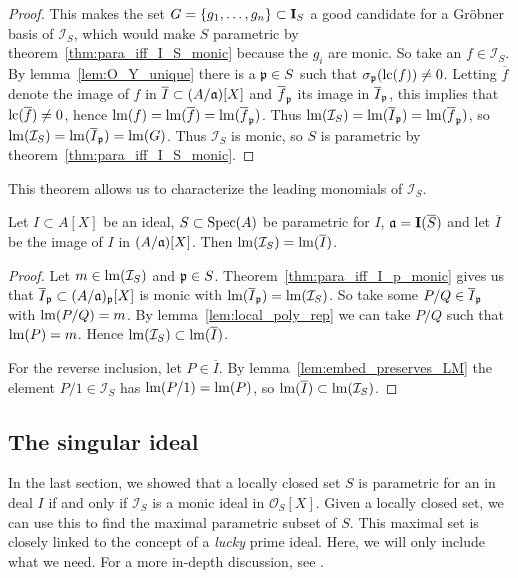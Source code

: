 \begin{proof}
  This makes the set $G = \{g_{1}, \dots, g_{n}\} \subset \operatorname{\mathbf I}_{S}$ a good candidate for a Gröbner basis of $\mathcal I_{S}$, which would make $S$ parametric by theorem~\ref{thm:para_iff_I_S_monic} because the $g_{i}$ are monic. So take an $f \in \mathcal I_{S}$. By lemma~\ref{lem:O_Y_unique} there is a $\mathfrak p \in S$ such that $\sigma_{\mathfrak p}(\operatorname{lc}(f)) \neq 0$. Letting $\overline f$ denote the image of $f$ in $\overline I \subset (A/\mathfrak{a})[X]$ and $\overline f_{\mathfrak p}$ its image in $\overline I_{\mathfrak p}$, this implies that $\operatorname{lc}(\overline f) \neq 0$, hence $\operatorname{lm}(f) = \operatorname{lm}(\overline f) = \operatorname{lm}(\overline f_{\mathfrak p})$. Thus $\operatorname{lm}(\mathcal I_{S}) = \operatorname{lm}(\overline I_{\mathfrak p}) = \operatorname{lm}(\overline f_{\mathfrak p})$, so $\operatorname{lm}(\mathcal I_{S}) = \operatorname{lm}(\overline I_{\mathfrak p}) = \operatorname{lm}(G)$. Thus $\mathcal I_{S}$ is monic, so $S$ is parametric by theorem~\ref{thm:para_iff_I_S_monic}.
\end{proof}

This theorem allows us to characterize the leading monomials of $\mathcal I_{S}$.

\begin{corollary}\label{cor:LM_I_S_eq_LM_overline_I}
  Let $I \subset A[X]$ be an ideal, $S \subset \operatorname{Spec}(A)$ be parametric for $I$, $\mathfrak{a} = \operatorname{\mathbf I}(\overline S)$ and let $\overline I$ be the image of $I$ in $(A/\mathfrak{a})[X]$. Then $\operatorname{lm}(\mathcal I_{S}) = \operatorname{lm}(\overline I)$.
\end{corollary}
\begin{proof}
  Let $m \in \operatorname{lm}(\mathcal I_{S})$ and $\mathfrak p \in S$. Theorem~\ref{thm:para_iff_I_p_monic} gives us that $\overline I_{\mathfrak p} \subset (A/\mathfrak{a})_{\mathfrak p}[X]$ is monic with $\operatorname{lm}(\overline I_{\mathfrak p}) = \operatorname{lm}(\mathcal I_{S})$. So take some $P/Q \in \overline I_{\mathfrak p}$ with $\operatorname{lm}(P/Q) = m$. By lemma~\ref{lem:local_poly_rep} we can take $P/Q$ such that $\operatorname{lm}(P) = m$. Hence $\operatorname{lm}(\mathcal I_{S}) \subset \operatorname{lm}(\overline I)$.

  For the reverse inclusion, let $P \in \overline I$. By lemma~\ref{lem:embed_preserves_LM} the element $P/1 \in \mathcal I_{S}$ has $\operatorname{lm}(P/1) = \operatorname{lm}(P)$, so $\operatorname{lm}(\overline I) \subset \operatorname{lm}(\mathcal I_{S})$.
\end{proof}















\subsection{The singular ideal}
In the last section, we showed that a locally closed set $S$ is parametric for an in deal $I$ if and only if $\mathcal I_{S}$ is a monic ideal in $\mathcal O_{S}[X]$. Given a locally closed set, we can use this to find the maximal parametric subset of $S$. This maximal set is closely linked to the concept of a \textit{lucky} prime ideal. Here, we will only include what we need. For a more in-depth discussion, see \cite{grb_covers}.

